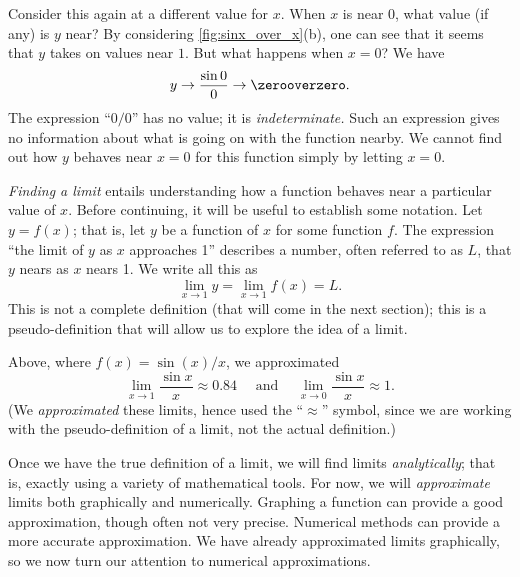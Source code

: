 Consider this again at a different value for $x$. When $x$ is near 0, what value (if any) is $y$ near? By considering \autoref{fig:sinx_over_x}(b), one can see that it seems that $y$ takes on values near $1$. But what happens when $x=0$? We have
\[y \rightarrow \frac{\sin 0}{0} \rightarrow \zerooverzero.\] 
The expression ``$0/0$'' has no value; it is \emph{indeterminate.}  Such an expression gives no information about what is going on with the function nearby. We cannot find out how $y$ behaves near $x=0$ for this function simply by letting $x=0$. 

\emph{Finding a limit} entails understanding how a function behaves near a particular value of $x$. Before continuing, it will be useful to establish some notation. Let $y=f(x)$; that is, let $y$ be a function of $x$ for some function $f$. The expression ``the limit of $y$ as $x$ approaches 1'' describes a number, often referred to as $L$, that $y$ nears as $x$ nears 1. We write all this as
\[\lim_{x\to 1} y = \lim_{x\to 1} f(x) = L.\]
This is not a complete definition (that will come in the next section); this is a pseudo-definition that will allow us to explore the idea of a limit. 

Above, where $f(x) = \sin(x)/x$, we approximated
\[\lim_{x\to 1} \frac{\sin x}{x} \approx 0.84 \quad \text{ and } \quad \lim_{x\to 0}\frac{\sin x}{x} \approx 1.\]
(We \emph{approximated} these limits, hence used the ``$\approx$'' symbol, since we are working with the pseudo-definition of a limit, not the actual definition.)

Once we have the true definition of a limit, we will find limits \emph{analytically}; that is, exactly using a variety of mathematical tools. For now, we will \emph{approximate} limits both graphically and numerically. Graphing a function can provide a good approximation, though often not very precise. Numerical methods can provide a more accurate approximation. We have already approximated limits graphically, so we now turn our attention to numerical approximations.

